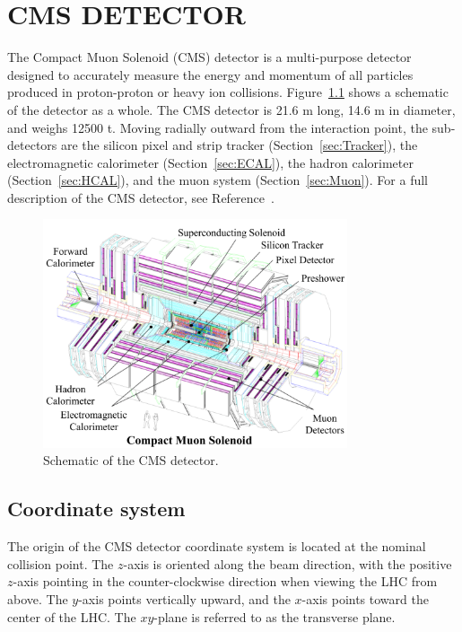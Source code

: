 \chapter{CMS DETECTOR}
\label{chap:Detector}

The Compact Muon Solenoid (CMS) detector is a multi-purpose detector designed to accurately measure the energy and momentum of all particles produced in proton-proton or heavy ion collisions. Figure~\ref{fig:CMS} shows a schematic of the detector as a whole. The CMS detector is 21.6 m long, 14.6 m in diameter, and weighs 12500 t. 
Moving radially outward from the interaction point, the sub-detectors are the silicon pixel and strip tracker (Section~\ref{sec:Tracker}), the electromagnetic calorimeter (Section~\ref{sec:ECAL}), the hadron calorimeter (Section~\ref{sec:HCAL}), and the muon system (Section~\ref{sec:Muon}). For a full description of the CMS detector, see Reference~\cite{Chatrchyan2008zzk}. 

\begin{figure}[h!]
	\centering
	\includegraphics[width=0.8\textwidth]{Figures/Detector/cms_labelled.pdf}
       \caption{Schematic of the CMS detector.
	}
   	\label{fig:CMS}
\end{figure}


\section{Coordinate system}
\label{sec:coordinates}
The origin of the CMS detector coordinate system is located at the nominal collision point. The $z$-axis is oriented along the beam direction, with the positive $z$-axis pointing in the counter-clockwise direction when viewing the LHC from above. The $y$-axis points vertically upward, and the $x$-axis points toward the center of the LHC. The $xy$-plane is referred to as the transverse plane.

